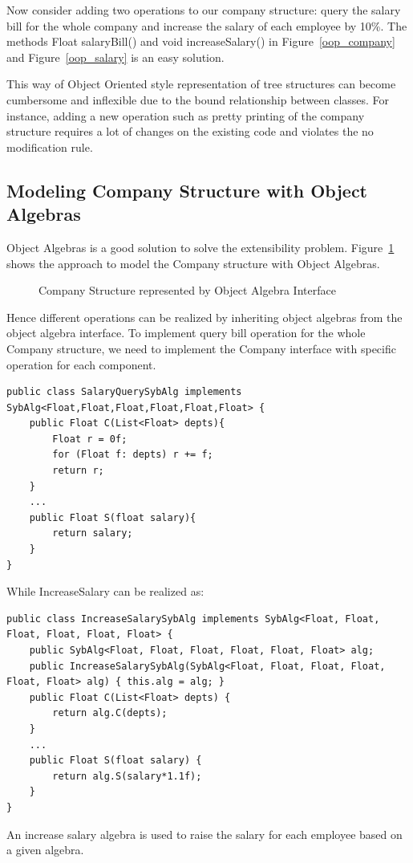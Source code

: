 Now consider adding two operations to our company structure: query the salary bill for the whole company and increase the salary of each employee by 10\%. The methods Float salaryBill() and void increaseSalary() in Figure~\ref{oop_company} and Figure~\ref{oop_salary} is an easy solution. 

This way of Object Oriented style representation of tree structures can become cumbersome and inflexible due to the bound relationship between classes. For instance, adding a new operation such as pretty printing of the company structure requires a lot of changes on the existing code and violates the no modification rule. 

\subsection{Modeling Company Structure with Object Algebras}
Object Algebras is a good solution to solve the extensibility problem. Figure~\ref{syb_tree} shows the approach to model the Company structure with Object Algebras. 
\begin{figure}[tb]
\vspace{-.1in}
\caption{Company Structure represented by Object Algebra Interface}
\label{syb_tree}
\end{figure}

Hence different operations can be realized by inheriting object algebras from the object algebra interface. To implement query bill operation for the whole Company structure, we need to implement the Company interface with specific operation for each component. 
\begin{lstlisting}[numbers=none] 
public class SalaryQuerySybAlg implements SybAlg<Float,Float,Float,Float,Float,Float> {
	public Float C(List<Float> depts){
		Float r = 0f;
		for (Float f: depts) r += f;
		return r;
	}
	...
	public Float S(float salary){
		return salary;
	}
}
\end{lstlisting}

While IncreaseSalary can be realized as: 
\begin{lstlisting}[numbers=none]
public class IncreaseSalarySybAlg implements SybAlg<Float, Float, Float, Float, Float, Float> {
	public SybAlg<Float, Float, Float, Float, Float, Float> alg;
	public IncreaseSalarySybAlg(SybAlg<Float, Float, Float, Float, Float, Float> alg) { this.alg = alg; }
	public Float C(List<Float> depts) {
		return alg.C(depts);
	}
	...
	public Float S(float salary) {
		return alg.S(salary*1.1f);
	}
}
\end{lstlisting}
An increase salary algebra is used to raise the salary for each employee based on a given algebra. 

